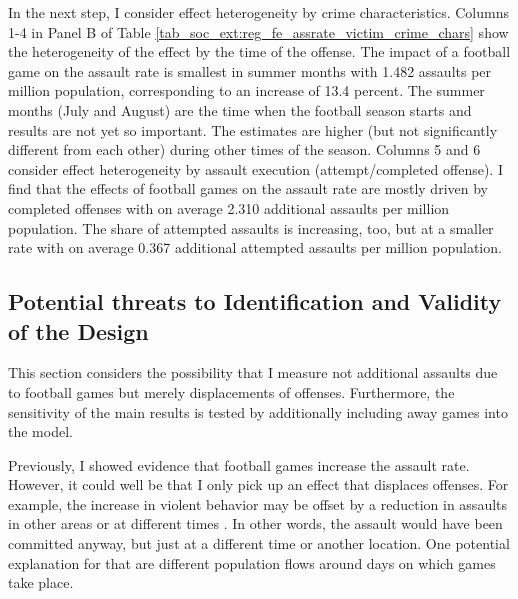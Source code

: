 

In the next step, I consider effect heterogeneity by crime characteristics. Columns 1-4 in Panel B of Table \ref{tab_soc_ext:reg_fe_assrate_victim_crime_chars} show the heterogeneity of the effect by the time of the offense. The impact of a football game on the assault rate is smallest in summer months with 1.482 assaults per million population, corresponding to an increase of 13.4 percent. The summer months (July and August) are the time when the football season starts and results are not yet so important. The estimates are higher (but not significantly different from each other) during other times of the season. Columns 5 and 6 consider effect heterogeneity by assault execution (attempt/completed offense). I find that the effects of football games on the assault rate are mostly driven by completed offenses with on average 2.310 additional assaults per million population. The share of attempted assaults is increasing, too, but at a smaller rate with on average 0.367 additional attempted assaults per million population.




\subsection{Potential threats to Identification and Validity of the Design}
This section considers the possibility that I measure not additional assaults due to football games but merely displacements of offenses. Furthermore, the sensitivity of the main results is tested by additionally including away games into the model.

Previously, I showed evidence that football games increase the assault rate. However, it could well be that I only pick up an effect that displaces offenses. For example, the increase in violent behavior may be offset by a reduction in assaults in other areas or at different times \citep{lindo2018college}. In other words, the assault would have been committed anyway, but just at a different time or another location. One potential explanation for that are different population flows around days on which games take place.



